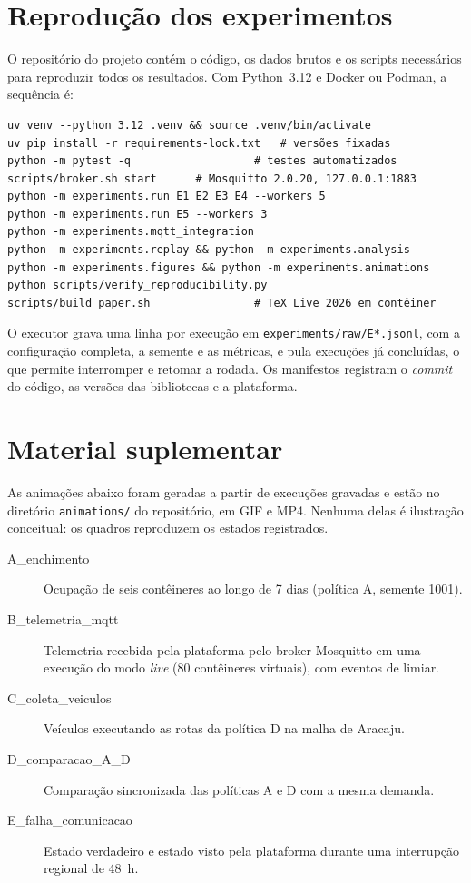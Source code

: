 \section{Reprodução dos experimentos}\label{ap:reproducao}

O repositório do projeto contém o código, os dados brutos e os scripts
necessários para reproduzir todos os resultados. Com Python~3.12 e Docker ou
Podman, a sequência é:

\begin{footnotesize}
\begin{verbatim}
uv venv --python 3.12 .venv && source .venv/bin/activate
uv pip install -r requirements-lock.txt   # versões fixadas
python -m pytest -q                   # testes automatizados
scripts/broker.sh start      # Mosquitto 2.0.20, 127.0.0.1:1883
python -m experiments.run E1 E2 E3 E4 --workers 5
python -m experiments.run E5 --workers 3
python -m experiments.mqtt_integration
python -m experiments.replay && python -m experiments.analysis
python -m experiments.figures && python -m experiments.animations
python scripts/verify_reproducibility.py
scripts/build_paper.sh                # TeX Live 2026 em contêiner
\end{verbatim}
\end{footnotesize}

O executor grava uma linha por execução em \texttt{experiments/raw/E*.jsonl},
com a configuração completa, a semente e as métricas, e pula execuções já
concluídas, o que permite interromper e retomar a rodada. Os manifestos
registram o \emph{commit} do código, as versões das bibliotecas e a
plataforma.

\section{Material suplementar}\label{ap:suplementar}

As animações abaixo foram geradas a partir de execuções gravadas e estão no
diretório \texttt{animations/} do repositório, em GIF e MP4. Nenhuma delas é
ilustração conceitual: os quadros reproduzem os estados registrados.

\begin{description}
  \item[A\_enchimento] Ocupação de seis contêineres ao longo de 7 dias
  (política A, semente 1001).
  \item[B\_telemetria\_mqtt] Telemetria recebida pela plataforma pelo broker
  Mosquitto em uma execução do modo \emph{live} (80 contêineres virtuais), com
  eventos de limiar.
  \item[C\_coleta\_veiculos] Veículos executando as rotas da política D na
  malha de Aracaju.
  \item[D\_comparacao\_A\_D] Comparação sincronizada das políticas A e D com a
  mesma demanda.
  \item[E\_falha\_comunicacao] Estado verdadeiro e estado visto pela plataforma
  durante uma interrupção regional de 48~h.
\end{description}

